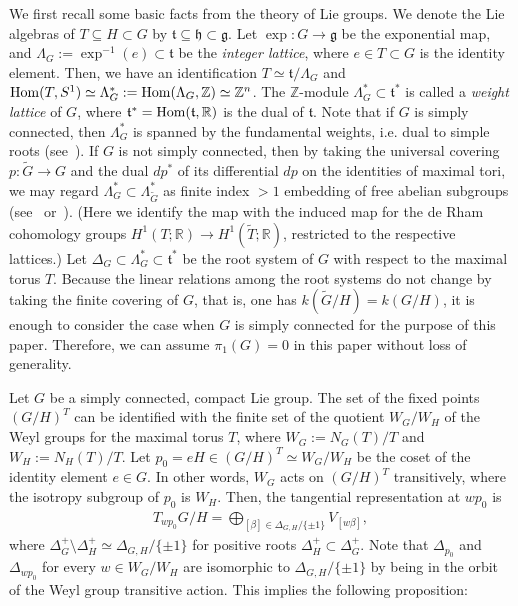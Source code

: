 \documentclass{amsart}
\theoremstyle{definition}
\theoremstyle{remark}
\numberwithin{equation}{section}
\newcommand{\R}{{\mathbb{R}}}
\begin{document}
We first recall some basic facts from the theory of Lie groups.
We denote the Lie algebras of $T\subseteq H\subset G$ by $\mathfrak{t}\subseteq \mathfrak{h}\subset \mathfrak{g}$.
Let $\exp:G\to \mathfrak{g}$ be the exponential map, and $\Lambda_{G}:=\exp^{-1}(e)\subset \mathfrak{t}$ be the {\it integer lattice}, where $e\in T\subset G$ is the identity element.
Then, we have an identification $T\simeq \mathfrak{t}/\Lambda_{G}$ and ${\rm Hom}(T,S^{1})\simeq \Lambda_{G}^{*}:= {\rm Hom}(\Lambda_{G},\mathbb{Z})\simeq \mathbb{Z}^{n}$.
The $\mathbb{Z}$-module $\Lambda^{*}_{G}\subset \mathfrak{t}^{*}$ is called a {\it weight lattice} of $G$, where $\mathfrak{t}^{*}={\rm Hom}(\mathfrak{t},\mathbb{R})$ is the dual of $\mathfrak{t}$.
Note that if $G$ is simply connected, then $\Lambda^{*}_{G}$ is spanned by the fundamental weights, i.e. dual to simple roots (see~\cite[Chapter 5 Theorem 6.36]{MiTo}).
If $G$ is not simply connected, then by taking the universal covering $p:\widetilde{G}\to G$ and the dual $dp^{*}$ of its differential $dp$ on the identities of maximal tori, 
we may regard $\Lambda_{G}^{*}\subset \Lambda_{\widetilde{G}}^{*}$ as finite index $>1$ embedding of free abelian subgroups (see~\cite[Chapter 5 Theorem 4.9]{MiTo} or~\cite[Section 19]{Bu}). 
(Here we identify the map with the induced map for the de Rham cohomology groups $H^{1}(T;\R)\to H^{1}(\widetilde{T};\R)$, restricted to the respective lattices.)
Let $\Delta_{G}\subset \Lambda_{G}^{*}\subset \mathfrak{t}^{*}$ be the root system of $G$ with respect to the maximal torus $T$.
Because the linear relations among the root systems do not change by taking the finite covering of $G$, that is, one has $k(\widetilde{G}/H)=k(G/H)$, it is enough to consider the case when $G$ is simply connected for the purpose of this paper.
Therefore, we can assume $\pi_{1}(G)=0$ in this paper without loss of generality.

Let $G$ be a simply connected, compact Lie group.
The set of the fixed points $(G/H)^{T}$ can be identified with the finite set of the quotient $W_{G}/W_{H}$ of the Weyl groups for the maximal torus $T$, where $W_{G}:=N_{G}(T)/T$ and $W_{H}:=N_{H}(T)/T$.
Let $p_0=eH\in (G/H)^{T}\simeq W_{G}/W_{H}$ be the coset of the identity element $e\in G$.
In other words, $W_{G}$ acts on $(G/H)^{T}$ transitively, where the isotropy subgroup of $p_{0}$ is $W_{H}$. 
Then, the tangential representation at $wp_{0}$ is 
\begin{align*}
T_{wp_0}G/H=\bigoplus_{[\beta]\in \Delta_{G,H}/\{\pm 1\}} V_{[w\beta]},
\end{align*}
where $\Delta_{G}^{+}\setminus \Delta_{H}^{+}\simeq \Delta_{G,H}/\{\pm 1\}$ for positive roots $\Delta_{H}^{+}\subset \Delta_{G}^{+}$.
Note that $\Delta_{p_{0}}$ and $\Delta_{wp_{0}}$ for every $w\in W_{G}/W_{H}$
are isomorphic to $\Delta_{G,H}/\{\pm 1\}$ by being in the orbit of the  Weyl group transitive action. 
This implies the following proposition:
\end{document}
